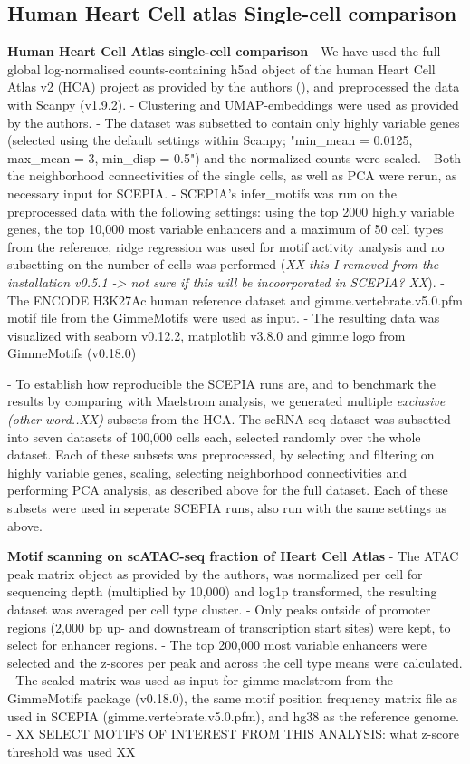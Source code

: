 \subsection{Human Heart Cell atlas Single-cell comparison}
\textbf{Human Heart Cell Atlas single-cell comparison }
- We have used the full global log-normalised counts-containing h5ad object of the human Heart Cell Atlas v2 (HCA) project as provided by the authors (\cite{Kanemaru2023}), and preprocessed the data with Scanpy (v1.9.2). 
- Clustering and UMAP-embeddings were used as provided by the authors.
- The dataset was subsetted to contain only highly variable genes (selected using the default settings within Scanpy; "min_mean = 0.0125, max_mean = 3, min_disp = 0.5") and the normalized counts were scaled. 
- Both the neighborhood connectivities of the single cells, as well as PCA were rerun, as necessary input for SCEPIA. 
- SCEPIA's infer_motifs was run on the preprocessed data with the following settings: using the top 2000 highly variable genes, the top 10,000 most variable enhancers and a maximum of 50 cell types from the reference, ridge regression was used for motif activity analysis and no subsetting on the number of cells was performed (\textit{XX this I removed from the installation v0.5.1 -> not sure if this will be incoorporated in SCEPIA? XX}). 
- The ENCODE H3K27Ac human reference dataset and gimme.vertebrate.v5.0.pfm motif file from the GimmeMotifs were used as input. 
- The resulting data was visualized with seaborn v0.12.2, matplotlib v3.8.0 and gimme logo from GimmeMotifs (v0.18.0)

- To establish how reproducible the SCEPIA runs are, and to benchmark the results by comparing with Maelstrom analysis, we generated multiple \textit{exclusive (other word..XX)} subsets from the HCA. The scRNA-seq dataset was subsetted into seven datasets of 100,000 cells each, selected randomly over the whole dataset. Each of these subsets was preprocessed, by selecting and filtering on highly variable genes, scaling, selecting neighborhood connectivities and performing PCA analysis, as described above for the full dataset. Each of these subsets were used in seperate SCEPIA runs, also run with the same settings as above. 


\textbf{Motif scanning on scATAC-seq fraction of Heart Cell Atlas}
- The ATAC peak matrix object as provided by the authors, was normalized per cell for sequencing depth (multiplied by 10,000) and log1p transformed, the resulting dataset was averaged per cell type cluster.  
- Only peaks outside of promoter regions (2,000 bp up- and downstream of transcription start sites) were kept, to select for enhancer regions. 
- The top 200,000 most variable enhancers were selected and the z-scores per peak and across the cell type means were calculated.
- The scaled matrix was used as input for gimme maelstrom from the GimmeMotifs package (v0.18.0), the same motif position frequency matrix file as used in SCEPIA (gimme.vertebrate.v5.0.pfm), and hg38 as the reference genome. 
- XX SELECT MOTIFS OF INTEREST FROM THIS ANALYSIS: what z-score threshold was used XX


